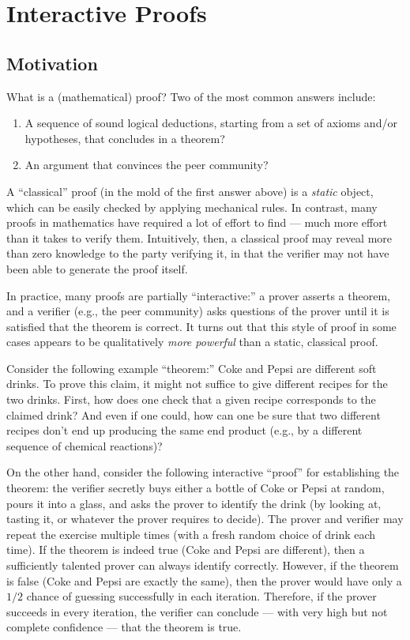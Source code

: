 \documentclass[11pt]{article}
\begin{document}
\section{Interactive Proofs}
\label{sec:interactive-proofs}

\subsection{Motivation}
\label{sec:motivation}

What is a (mathematical) proof?  Two of the most common answers
include:
\begin{enumerate}
\item A sequence of sound logical deductions, starting from a set of
  axioms and/or hypotheses, that concludes in a theorem?
\item An argument that convinces the peer community?
\end{enumerate}

A ``classical'' proof (in the mold of the first answer above) is a
\emph{static} object, which can be easily checked by applying
mechanical rules.  In contrast, many proofs in mathematics have
required a lot of effort to find --- much more effort than it takes to
verify them.  Intuitively, then, a classical proof may reveal more
than zero knowledge to the party verifying it, in that the verifier
may not have been able to generate the proof itself.

In practice, many proofs are partially ``interactive:'' a prover
asserts a theorem, and a verifier (e.g., the peer community) asks
questions of the prover until it is satisfied that the theorem is
correct.  It turns out that this style of proof in some cases appears
to be qualitatively \emph{more powerful} than a static, classical
proof.

Consider the following example ``theorem:'' Coke and Pepsi are
different soft drinks.  To prove this claim, it might not suffice to
give different recipes for the two drinks.  First, how does one check
that a given recipe corresponds to the claimed drink?  And even if one
could, how can one be sure that two different recipes don't end up
producing the same end product (e.g., by a different sequence of
chemical reactions)?

On the other hand, consider the following interactive ``proof'' for
establishing the theorem: the verifier secretly buys either a bottle
of Coke or Pepsi at random, pours it into a glass, and asks the prover
to identify the drink (by looking at, tasting it, or whatever the
prover requires to decide).  The prover and verifier may repeat the
exercise multiple times (with a fresh random choice of drink each
time).  If the theorem is indeed true (Coke and Pepsi are different),
then a sufficiently talented prover can always identify correctly.
However, if the theorem is false (Coke and Pepsi are exactly the
same), then the prover would have only a $1/2$ chance of guessing
successfully in each iteration.  Therefore, if the prover succeeds in
every iteration, the verifier can conclude --- with very high but not
complete confidence --- that the theorem is true.
\end{document}
